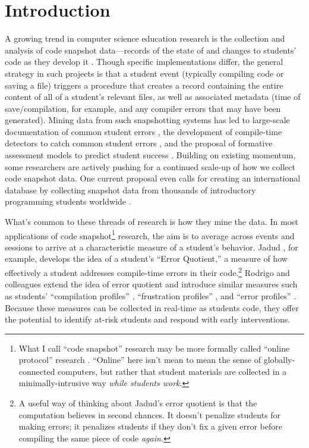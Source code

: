 \section{Introduction}\label{introduction}

A growing trend in computer science education research is the collection and analysis of code snapshot data—records of the state of and changes to students’ code as they develop it \cite{jadud_methods_2006,rodrigo_analyzing_2009,spacco_marmoset_2006}. Though specific implementations differ, the general strategy in such projects is that a student event (typically compiling code or saving a file) triggers a procedure that creates a record containing the entire content of all of a student's relevant files, as well as associated metadata (time of save/compilation, for example, and any compiler errors that may have been generated). Mining data from such snapshotting systems has led to large-scale documentation of common student errors \cite{spacco_marmoset_2006}, the development of compile-time detectors to catch common student errors \cite{spacco_software_2005}, and the proposal of formative assessment models to predict student success \cite{jadud_methods_2006,tabanao_predicting_2011}. Building on existing momentum, some researchers are actively pushing for a continued scale-up of how we collect code snapshot data. One current proposal even calls for creating an international database by collecting snapshot data from thousands of introductory programming students worldwide \cite{kolling_building_2012}.

What's common to these threads of research is how they mine the data. In
most applications of code snapshot\footnote{What I call ``code
  snapshot'' research may be more formally called ``online protocol''
  research \cite{jadud_methods_2006,rodrigo_analyzing_2009}. ``Online'' here isn't mean to mean
  the sense of globally-connected computers, but rather that student
  materials are collected in a minimally-intrusive way \emph{while
  students work}.} research, the aim is to average across events and
sessions to arrive at a characteristic measure of a student's behavior.
Jadud \cite{jadud_methods_2006}, for example, develops the idea of a student's ``Error
Quotient,'' a measure of how effectively a student addresses
compile-time errors in their code.\footnote{A useful way of thinking
  about Jadud's \cite{jadud_methods_2006} error quotient is that the computation believes
  in second chances. It doesn't penalize students for making errors; it
  penalizes students if they don't fix a given error before compiling
  the same piece of code \emph{again.}} Rodrigo and colleagues extend
the idea of error quotient and introduce similar
measures such as students' ``compilation profiles'' \cite{rodrigo_analyzing_2009}, ``frustration profiles'' \cite{rodrigo_affective_2009}, and ``error
profiles'' \cite{tabanao_predicting_2011}. Because these measures can be
collected in real-time as students code, they offer the potential to
identify at-risk students and respond with early
interventions.

